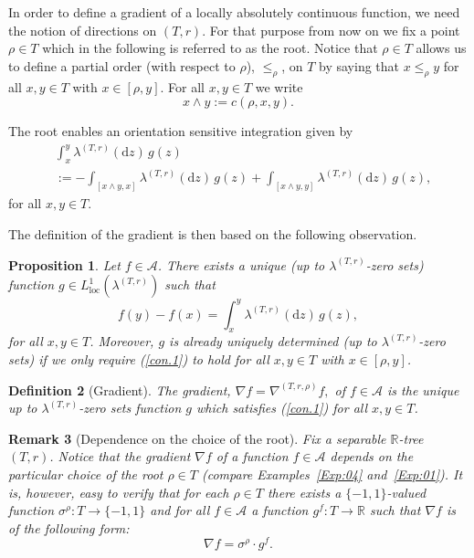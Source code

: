 \documentclass[11pt]{amsart}
\numberwithin{equation}{section}
\newtheorem{definition}{Definition}[section]
\newtheorem{proposition}[definition]{Proposition}
\newtheorem{remark}[definition]{Remark}
\begin{document}
In order to define a {{\it} gradient} of a locally absolutely continuous function, we need the notion of directions on $(T,r)$. For that purpose from now on we fix a point $\rho\in T$ which in the following is referred to as the {{\it} root}.
Notice that $\rho\in T$ allows us to define a partial order (with respect to $\rho$), $\le_\rho$, on $T$ by saying
that $x\le_\rho y$ for all $x,y\in T$ with $x\in[\rho,y]$.
For all $x,y\in T$ we write
\begin{equation}
\label{e:wedge}
   x\wedge y
 :=
   c(\rho,x,y).
\end{equation}

 The root enables an  orientation sensitive
integration given by
\begin{equation}\label{osi}
\begin{aligned}
   &\int_x^y\lambda^{(T,r)}(\mathrm{d}z)\,g(z)
  \\
  &:=   -\int_{[{x\wedge y},x ]}\lambda^{(T,r)}(\mathrm{d}z)\,g(z)+\int_{[{x\wedge y},y]}\lambda^{(T,r)}(\mathrm{d}z)\,g(z),
\end{aligned}
\end{equation}
for all $x,y\in T$.

The definition of the gradient is then based on the following observation.
\begin{proposition}
Let $f\in\mathcal A$. \label{P:grad}
There exists a unique (up to $\lambda^{(T,r)}$-zero sets) function
$g\in L_{\mathrm{loc}}^1(\lambda^{(T,r)})$ such that
\begin{equation}\label{con.1}
   f(y)-f(x)
 =
   \int_x^y\lambda^{(T,r)}(\mathrm{d}z)\,g(z),
\end{equation}
for all $x,y\in T$. Moreover, $g$ is already uniquely determined  (up to $\lambda^{(T,r)}$-zero sets) if we only require (\ref{con.1}) to hold for all $x,y\in T$ with $x\in[\rho,y]$.
\end{proposition}{\smallskip}

\begin{definition}[Gradient] The gradient, $\nabla f=\nabla^{(T,r,\rho)} f,$ of $f\in{\mathcal A}$ is the unique up to $\lambda^{(T,r)}$-zero sets function $g$ which satisfies (\ref{con.1}) for all $x,y\in T$.
\label{Def:01}
\end{definition}{\smallskip}

{
\begin{remark}[Dependence on the choice of the root] \rm Fix a separable $\mathbb{R}$-tree $(T,r)$.
 Notice that the gradient $\nabla f$ of a function $f\in{\mathcal A}$ depends on the particular choice of the root $\rho\in T$ (compare Examples~\ref{Exp:04} and~\ref{Exp:01}). It is, however, easy to verify that  for each $\rho\in T$ there exists a $\{-1,1\}$-valued function $\sigma^\rho:T\to\{-1,1\}$ and for all $f\in{\mathcal A}$ a function $g^f:T\to\mathbb{R}$ such that $\nabla f$ is of the following form:
 \begin{equation}
 \label{e:formgrad}
   \nabla f=\sigma^\rho\cdot g^f.
 \end{equation}
 \label{Rem:06}
\end{remark}{\smallskip}
}
\end{document}
